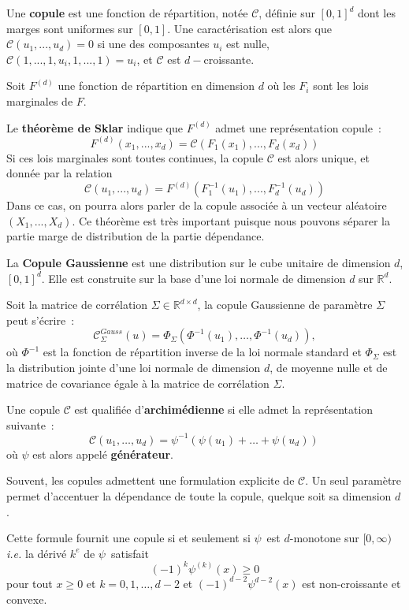 \begin{f}[Copule]
Une \textbf{copule} est une fonction de répartition, notée $\mathcal{C}$, définie sur $[0,1]^d$ dont les marges sont uniformes sur $[0,1]$. 
Une caractérisation est alors que $\mathcal{C}(u_1,...,u_d)=0$ si une des composantes $u_i$ est nulle, $\mathcal{C}(1,...,1,u_i,1,...,1)=u_i$, et $\mathcal{C}$ est $d-$croissante.
\medskip
		
Soit $F^{(d)}$ une fonction de répartition en dimension $d$  où les $F_i$ sont les lois marginales de $F$. 

Le\textbf{ théorème de Sklar} indique que $F^{(d)}$ admet une représentation copule~:
$$
F^{(d)} (x_1,...,x_d) = \mathcal{C} (F_1(x_1),...,F_d(x_d))
$$
Si ces lois marginales sont toutes continues, la copule $\mathcal{C}$ est alors unique, et donnée par la relation 
$$
\mathcal{C}(u_1,...,u_d)=F^{(d)}(F_1^{-1} (u_1),...,F_d^{-1} (u_d))
$$
Dans ce cas, on pourra alors parler de la copule associée à un vecteur aléatoire $(X_1,...,X_d)$.	
Ce théorème est très important puisque nous pouvons séparer la partie marge de distribution de la partie dépendance. 
\medskip
	
La \textbf{Copule Gaussienne} est une distribution sur le cube unitaire de dimension $d$, $[0,1]^d$. 
Elle est construite sur la base d'une loi normale de dimension $d$ sur  $\mathbb{R}^d$.

Soit la matrice de corrélation  $\Sigma\in\mathbb{R}^{d\times d}$, la copule Gaussienne de paramètre  $\Sigma$ peut s'écrire~:
$$
\mathcal{C}_\Sigma^{Gauss}(u) = \Phi_\Sigma\left(\Phi^{-1}(u_1),\dots, \Phi^{-1}(u_d) \right), 
$$
où $\Phi^{-1}$ est la fonction de répartition inverse de la loi normale standard et  $\Phi_\Sigma$ est la distribution jointe d'une loi normale de dimension $d$, de moyenne nulle et de matrice de covariance égale à la matrice de corrélation  $\Sigma$.
\medskip	

	Une copule $\mathcal{C}$ est qualifiée d'\textbf{archimédienne} si elle admet la représentation suivante~:
$$
\mathcal{C}(u_1,\dots,u_d) = \psi^{-1}\left(\psi(u_1)+\dots+\psi(u_d)\right)\,
$$
où $\psi$ est alors appelé \textbf{générateur}.

Souvent, les copules  admettent une formulation explicite de  $\mathcal{C}$. 
Un seul paramètre permet d'accentuer la dépendance de toute la copule, quelque soit sa dimension $d$.


Cette formule fournit une copule si et seulement si $\psi\,$ est $d$-monotone sur $[0,\infty)$ \emph{i.e.} la dérivé $k^e$  de $\psi\,$ satisfait
$$
(-1)^k\psi^{(k)}(x) \geq 0
$$
pour tout $x\geq 0$ et $k=0,1,\dots,d-2$ et $(-1)^{d-2}\psi^{d-2}(x)$ est non-croissante et convexe.
\medskip


\end{f}
